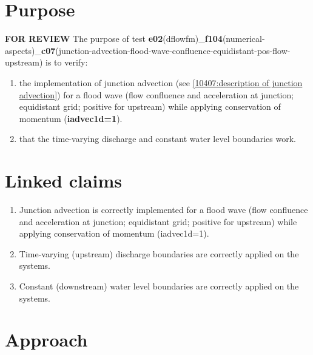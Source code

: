\section*{Purpose}
\textbf{FOR REVIEW} 
The purpose of test \textbf{e02}(dflowfm)\_\textbf{f104}(numerical-aspects)\_\textbf{c07}(junction-advection-flood-wave-confluence-equidistant-pos-flow-upstream) is to verify:

\begin{enumerate}
	\item the implementation of junction advection (see \autoref{10407:description of junction advection}) for a flood wave (flow confluence and acceleration at junction; equidistant grid; positive for upstream) while applying conservation of momentum (\textbf{\textcolor[rgb]{1,0,0}{iadvec1d=1}}).
	\item that the time-varying discharge and constant water level boundaries work. 

\end{enumerate}

\section*{Linked claims}
\begin{enumerate}
	\item Junction advection is correctly implemented for a flood wave (flow confluence and acceleration at junction; equidistant grid; positive for upstream) while applying conservation of momentum (iadvec1d=1). 
	\item Time-varying (upstream) discharge boundaries are correctly applied on the systems.
	\item Constant (downstream) water level boundaries are correctly applied on the systems.
\end{enumerate}


\section*{Approach}

